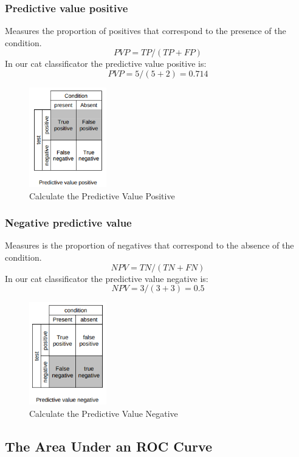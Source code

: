 \subsubsection[Predictive value positive]{Predictive value positive}
Measures the proportion of positives that correspond to the presence of the condition.
\[ PVP  =  TP/(TP+FP) \]
In our cat classificator the predictive value positive is:
\[ PVP = 5/(5+2) = 0.714 \]

\begin{figure}[H]
\centering
\includegraphics[width=0.3\textwidth]{./figures/PredictiveValuePositive}
\caption{Calculate the Predictive Value Positive}
\end{figure}


\subsubsection[Negative predictive value]{Negative predictive value}
Measures is the proportion of negatives that correspond to the absence of the condition. 
\[ NPV =  TN/(TN+FN) \]
In our cat classificator the predictive value negative is:
\[ NPV = 3/(3+3) = 0.5 \]

\begin{figure}[H]
\centering
\includegraphics[width=0.3\textwidth]{./figures/PredictiveValueNegative}
\caption{Calculate the Predictive Value Negative}
\end{figure}

\subsection[The Area Under an ROC Curve]{The Area Under an ROC Curve}

